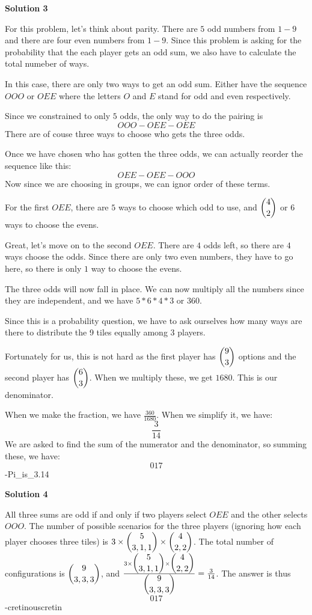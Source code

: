 \begin{enumerate}
 



\textbf{Solution 3}

For this problem, let's think about parity. There are $5$ odd numbers from $1-9$ and there are four even numbers from $1-9$. Since this problem is asking for the probability that the each player gets an odd sum, we also have to calculate the total numeber of ways. 

 In this case, there are only two ways to get an odd sum. Either have the sequence $OOO$ or $OEE$ where the letters $O$ and $E$ stand for odd and even respectively. 

 Since we constrained to only $5$ odds, the only way to do the pairing is 
 \[OOO-OEE-OEE\]There are of couse three ways to choose who gets the three odds. 

 Once we have chosen who has gotten the three odds, we can actually reorder the sequence like this:
 \[OEE-OEE-OOO\]Now since we are choosing in groups, we can ignor order of these terms.

 For the first $OEE$, there are $5$ ways to choose which odd to use, and $\dbinom{4}{2}$ or $6$ ways to choose the evens.

 Great, let's move on to the second $OEE$. There are $4$ odds left, so there are $4$ ways choose the odds. Since there are only two even numbers, they have to go here, so there is only $1$ way to choose the evens. 

 The three odds will now fall in place. We can now multiply all the numbers since they are independent, and we have $5*6*4*3$ or $360$. 

 Since this is a probability question, we have to ask ourselves how many ways are there to distribute the 9 tiles equally among 3 players. 

 Fortunately for us, this is not hard as the first player has $\dbinom{9}{3}$ options and the second player has $\dbinom{6}{3}$. When we multiply these, we get $1680$. This is our denominator.

 When we make the fraction, we have $\frac{360}{1680}$. When we simplify it, we have:
 \[\frac{3}{14}\]We are asked to find the sum of the numerator and the denominator, so summing these, we have:
 \[\boxed{017}\]-Pi\_is\_3.14

 



\textbf{Solution 4}

All three sums are odd if and only if two players select $OEE$ and the other selects $OOO$. The number of possible scenarios for the three players (ignoring how each player chooses three tiles) is $3\times \dbinom{5}{3, 1, 1}\times\dbinom{4}{2, 2}$. The total number of configurations is $\dbinom{9}{3, 3, 3}$, and $\frac{3\times\dbinom{5}{3, 1, 1}\times\dbinom{4}{2, 2}}{\dbinom{9}{3, 3, 3}}=\frac{3}{14}$. The answer is thus 
 \[\boxed{017}\]-cretinouscretin


\end{enumerate}
